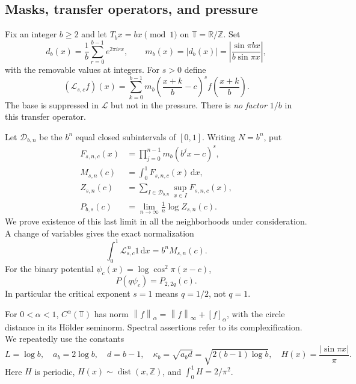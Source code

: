 \documentclass[11pt,a4paper]{article}
\numberwithin{equation}{section}
\theoremstyle{definition}
\theoremstyle{remark}
\newcommand{\TT}{\mathbb T}
\newcommand{\RR}{\mathbb R}
\newcommand{\ZZ}{\mathbb Z}
\newcommand{\dd}{\,\mathrm d}
\newcommand{\Lop}{\mathcal L}
\newcommand{\dist}{\operatorname{dist}}
\newcommand{\norm}[1]{\left\lVert#1\right\rVert}
\begin{document}
\subsection{Masks, transfer operators, and pressure}
Fix an integer $b\ge2$ and let $T_bx=bx\pmod1$ on $\TT=\RR/\ZZ$.
Set
\begin{equation}
 d_b(x)=\frac1b\sum_{r=0}^{b-1}e^{2\pi i r x},\qquad
 m_b(x)=|d_b(x)|=
 \left|\frac{\sin\pi bx}{b\sin\pi x}\right|,
 \label{eq:mask}
\end{equation}
with the removable values at integers. For $s>0$ define
\begin{equation}
 (\Lop_{s,c}f)(x)=\sum_{k=0}^{b-1}
 m_b\left(\frac{x+k}{b}-c\right)^s f\left(\frac{x+k}{b}\right).
 \label{eq:transfer}
\end{equation}
The base is suppressed in $\Lop$ but not in the pressure.
There is \emph{no factor $1/b$} in this transfer operator.

Let $\mathcal D_{b,n}$ be the $b^n$ equal closed subintervals of $[0,1]$.
Writing $N=b^n$, put
\begin{align}
 F_{s,n,c}(x)&=\prod_{j=0}^{n-1}m_b(b^jx-c)^s,\\
 M_{s,n}(c)&=\int_0^1F_{s,n,c}(x)\dd x,\\
 Z_{s,n}(c)&=\sum_{I\in\mathcal D_{b,n}}\sup_{x\in I}F_{s,n,c}(x),\\
 P_{b,s}(c)&=\lim_{n\to\infty}\frac1n\log Z_{s,n}(c).
 \label{eq:pressure}
\end{align}
We prove existence of this last limit in all the neighborhoods under
consideration. A change of variables gives the exact normalization
\begin{equation}
 \int_0^1\Lop_{s,c}^{\,n}1\dd x=b^nM_{s,n}(c).
 \label{eq:moment}
\end{equation}
For the binary potential $\psi_c(x)=\log\cos^2\pi(x-c)$,
\begin{equation}
 P(q\psi_c)=P_{2,2q}(c).
 \label{eq:binary}
\end{equation}
In particular the critical exponent $s=1$ means $q=1/2$, not $q=1$.

For $0<\alpha<1$, $C^\alpha(\TT)$ has norm
$\norm f_\alpha=\norm f_\infty+[f]_\alpha$, with the circle distance
in its H\"older seminorm. Spectral assertions refer to its complexification.
We repeatedly use the constants
\begin{equation}
 L=\log b,\quad a_b=2\log b,\quad d=b-1,\quad
 \kappa_b=\sqrt{a_bd}=\sqrt{2(b-1)\log b},\quad
 H(x)=\frac{|\sin\pi x|}{\pi}.
 \label{eq:constants}
\end{equation}
Here $H$ is periodic, $H(x)\sim\dist(x,\ZZ)$, and
$\int_0^1H=2/\pi^2$.
\end{document}
